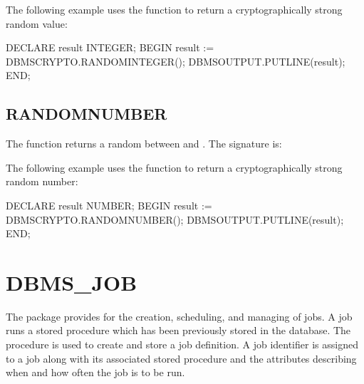 \documentclass[letterpaper,10pt,english,openany,oneside]{sphinxmanual}
\begin{document}

The following example uses the  function to return a
cryptographically strong random  value:

%
\begin{sphinxVerbatim}[commandchars=\\\{\}]
DECLARE
  result INTEGER;
BEGIN
  result := DBMS\PYGZus{}CRYPTO.RANDOMINTEGER();
  DBMS\PYGZus{}OUTPUT.PUT\PYGZus{}LINE(result);
END;
\end{sphinxVerbatim}

\newpage


\subsection{RANDOMNUMBER}
\label{\detokenize{randomnumber::doc}}\label{\detokenize{randomnumber:randomnumber}}
The  function returns a random  between  and
. The signature is:
\begin{quote}

\end{quote}


The following example uses the  function to return a
cryptographically strong random number:

%
\begin{sphinxVerbatim}[commandchars=\\\{\}]
DECLARE
  result NUMBER;
BEGIN
  result := DBMS\PYGZus{}CRYPTO.RANDOMNUMBER();
  DBMS\PYGZus{}OUTPUT.PUT\PYGZus{}LINE(result);
END;
\end{sphinxVerbatim}

\newpage


\section{DBMS\_JOB}
\label{\detokenize{dbms_job::doc}}\label{\detokenize{dbms_job:dbms-job}}
The  package provides for the creation, scheduling, and
managing of jobs. A job runs a stored procedure which has been
previously stored in the database. The  procedure is used to
create and store a job definition. A job identifier is assigned to a job
along with its associated stored procedure and the attributes describing
when and how often the job is to be run.
\end{document}
